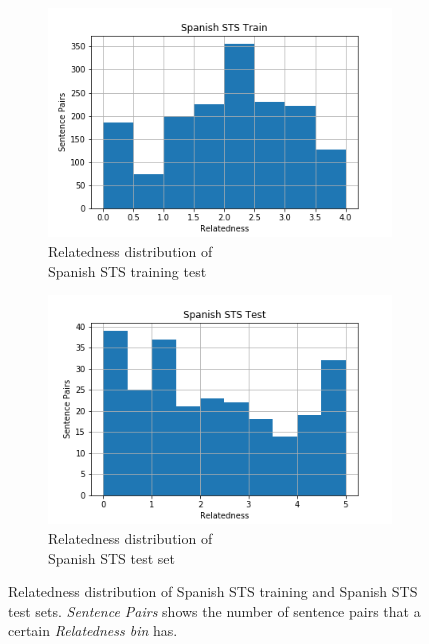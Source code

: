 \begin{enumerate}
\begin{figure}
	\captionsetup[subfigure]{justification=centering}
	\centering
	\begin{subfigure}[b]{.5\textwidth}
		\centering
		\includegraphics[width=\textwidth]{figures/semantic_textual_similarity/introduction/sts_spanish_train.png}
		\caption{Relatedness distribution of \\ Spanish STS  training test}
		\label{fig:spanish_train_relatedness}
	\end{subfigure}%
	\begin{subfigure}[b]{.5\textwidth}
		\centering
		\includegraphics[width=\textwidth]{figures/semantic_textual_similarity/introduction/sts_spanish_test.png}
		\caption{Relatedness distribution of \\ Spanish STS  test set}
		\label{fig:spanish_test_relatedness}
	\end{subfigure}
	\caption[Relatedness distribution of Spanish STS training and Spanish STS test sets]{Relatedness distribution of Spanish STS training and Spanish STS test sets. \textit{Sentence Pairs} shows the number of sentence pairs that a certain \textit{Relatedness bin} has.}
	\label{fig:spanish_sts_relatedness}
\end{figure}



\end{enumerate}
